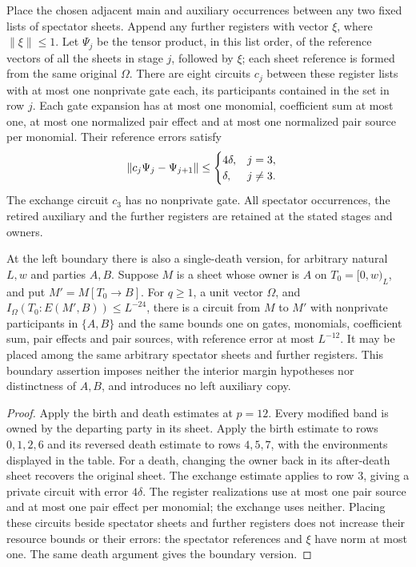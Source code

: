 \begin{lemma}
    Place the chosen adjacent main and auxiliary occurrences between any two
    fixed lists of spectator sheets. Append any further registers with vector
    $\xi$, where $\lVert\xi\rVert\le1$.
    Let $\Psi_j$ be the tensor product, in this list order, of the reference
    vectors of all the sheets in stage $j$, followed by $\xi$; each sheet
    reference is formed from the same original $\Omega$.
    There are eight circuits $c_j$ between these register lists with
    at most one nonprivate gate each, its participants contained in the set
    in row $j$. Each gate expansion has at most one monomial, coefficient
    sum at most one, at most one normalized pair effect and at most one
    normalized pair source per monomial. Their reference errors satisfy
    \begin{align}
        \lVert c_j\Psi_j-\Psi_{j+1}\rVert
         & \le\begin{cases}4\delta,&j=3,\\ \delta,&j\ne3.\end{cases}\notag
    \end{align}
    The exchange circuit $c_3$ has no nonprivate gate. All spectator
    occurrences, the retired auxiliary and the further registers are
    retained at the stated stages and owners.

    At the left boundary there is also a single-death version, for arbitrary
    natural $L,w$ and parties $A,B$. Suppose $M$ is a sheet whose
    owner is $A$ on $T_0=\lbrack 0,w)_L$, and put $M'=M[T_0\to B]$.
    For $q\ge1$, a unit vector $\Omega$, and
    $I_\Omega(T_0:E(M',B))\le L^{-24}$, there is a circuit from $M$ to $M'$
    with nonprivate participants in $\{A,B\}$ and the same bounds one on
    gates, monomials, coefficient sum, pair effects and pair sources, with
    reference error at most $L^{-12}$. It may be placed among the same
    arbitrary spectator sheets and further registers. This boundary assertion
    imposes neither the interior margin hypotheses nor distinctness of $A,B$,
    and introduces no left auxiliary copy.
\end{lemma}
\begin{proof}\leanok
    Apply the birth and death estimates at $p=12$.
    Every modified band is owned by the departing party in its sheet.
    Apply the birth estimate to rows $0,1,2,6$ and its reversed
    death estimate to rows $4,5,7$, with the environments displayed in the
    table. For a death, changing the owner back in its after-death sheet
    recovers the original sheet. The exchange estimate applies to row $3$,
    giving a private circuit with error $4\delta$.
    The register realizations use at most one pair source and at most one
    pair effect per monomial; the exchange uses neither. Placing these circuits beside spectator
    sheets and further registers does not increase their resource bounds or
    their errors: the spectator references and $\xi$ have norm at most one.
    The same death argument gives the boundary version.
\end{proof}

